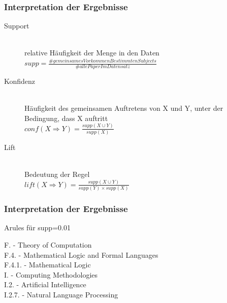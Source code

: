 \documentclass[12pt, xcolor=table]{beamer}
\renewcommand{\footnotesize}{\tiny}
\begin{document}
\begin{frame}
	\frametitle{Interpretation der Ergebnisse}
    \begin{center}
        \begin{description}
			\item [Support  ] \hfill \\
                relative Häufigkeit der Menge in den Daten\\
                $supp = \frac{\# gemeinsames Vorkommen Bestimmten Subjects}{\# alle Paper Im Datensatz}$\\
			\item [Konfidenz ] \hfill \\
                Häufigkeit des gemeinsamen Auftretens von X und Y, unter der Bedingung, dass X auftritt\\
                $conf(X\Rightarrow Y) = \frac{supp(X\cup Y)}{supp(X)} $\\

			\item [Lift ] \hfill \\
                Bedeutung der Regel\\
                $lift(X\Rightarrow Y) = \frac{supp(X\cup Y)}{supp(Y)\times supp(X)} $\\
	    \end{description}
    \end{center}
\end{frame}
\begin{frame}[fragile]
    \frametitle{Interpretation der Ergebnisse}
    \begin{block}{Arules für supp=0.01}
    	
	\end{block}
    {\footnotesize
        F. - Theory of Computation\\
        F.4. - Mathematical Logic and Formal Languages\\
        F.4.1. - Mathematical Logic\\
        I. - Computing Methodologies\\
        I.2. - Artificial Intelligence\\
        I.2.7. - Natural Language Processing\\
    }
\end{frame}
\end{document}
